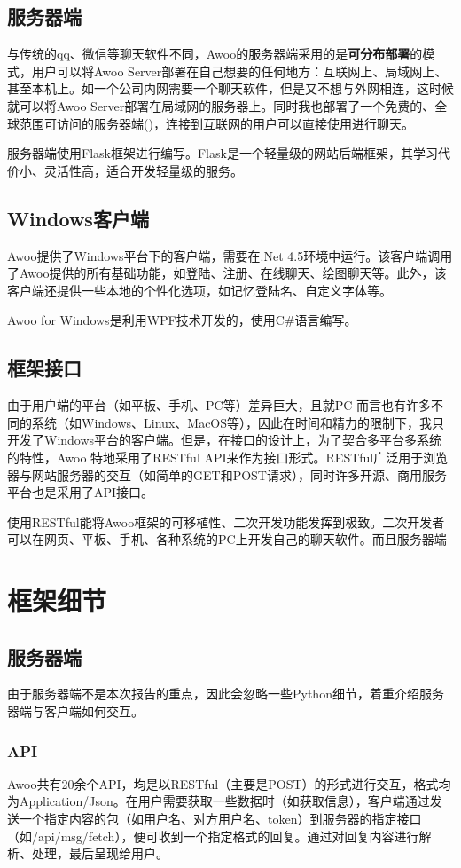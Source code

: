 \documentclass[a4paper,11pt]{article}
\begin{document}
    \subsection{服务器端}
        与传统的qq、微信等聊天软件不同，Awoo的服务器端采用的是\textbf{可分布部署}的模式，用户可以将Awoo Server部署在自己想要的任何地方：互联网上、局域网上、甚至本机上。如一个公司内网需要一个聊天软件，但是又不想与外网相连，这时候就可以将Awoo Server部署在局域网的服务器上。同时我也部署了一个免费的、全球范围可访问的服务器端(\cite{1})，连接到互联网的用户可以直接使用\cite{1}进行聊天。\par
        服务器端使用Flask\textsuperscript{\cite{3}}框架进行编写。Flask是一个轻量级的网站后端框架，其学习代价小、灵活性高，适合开发轻量级的服务。
    \subsection{Windows客户端}
        Awoo提供了Windows平台下的客户端，需要在.Net 4.5环境中运行。该客户端调用了Awoo提供的所有基础功能，如登陆、注册、在线聊天、绘图聊天等。此外，该客户端还提供一些本地的个性化选项，如记忆登陆名、自定义字体等。\par
        Awoo for Windows是利用WPF技术开发的，使用C\#语言编写。
    \subsection{框架接口}
        由于用户端的平台（如平板、手机、PC等）差异巨大，且就PC 而言也有许多不同的系统（如Windows、Linux、MacOS等），因此在时间和精力的限制下，我只开发了Windows平台的客户端。但是，在接口的设计上，为了契合多平台多系统的特性，Awoo 特地采用了RESTful API来作为接口形式。RESTful广泛用于浏览器与网站服务器的交互（如简单的GET和POST请求），同时许多开源、商用服务平台也是采用了API接口。\par
        使用RESTful能将Awoo框架的可移植性、二次开发功能发挥到极致。二次开发者可以在网页、平板、手机、各种系统的PC上开发自己的聊天软件。而且服务器端

\section{框架细节}
    \subsection{服务器端}
        由于服务器端不是本次报告的重点，因此会忽略一些Python细节，着重介绍服务器端与客户端如何交互。
        \subsubsection{API}
            Awoo共有20余个API，均是以RESTful（主要是POST）的形式进行交互，格式均为Application/Json。在用户需要获取一些数据时（如获取信息），客户端通过发送一个指定内容的包（如用户名、对方用户名、token）到服务器的指定接口（如/api/msg/fetch），便可收到一个指定格式的回复。通过对回复内容进行解析、处理，最后呈现给用户。
\end{document}

